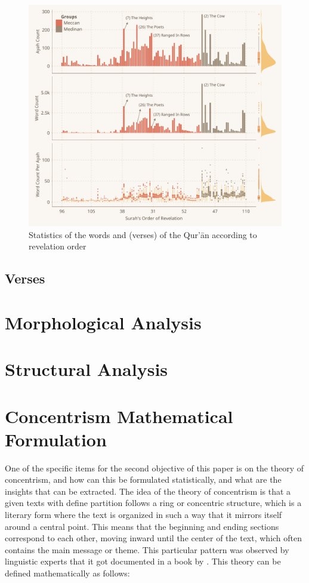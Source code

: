 \begin{figure}[!t]
    \centering
    \includegraphics[width=\textwidth]{img/plot2.pdf}
    \caption{Statistics of the words and   (verses) of the Qur'\=an according to revelation order}
    \label{fig:ch4_ayah_word_count_rev_order}
\end{figure}

\subsection{Verses}\label{sec:ch4_desc_stat_verse}
\section{Morphological Analysis}\label{sec:ch4_morphological_analysis}
\section{Structural Analysis}\label{sec:ch4_structural_analysis}
\section{Concentrism Mathematical Formulation}
One of the specific items for the second objective of this paper is on the theory of concentrism, and how can this be formulated statistically, and what are the insights that can be extracted. The idea of the theory of concentrism is that a given texts with define partition follows a ring or concentric structure, which is a literary form where the text is organized in such a way that it mirrors itself around a central point. This means that the beginning and ending sections correspond to each other, moving inward until the center of the text, which often contains the main message or theme. This particular pattern was observed by linguistic experts that it got documented in a book by . This theory can be defined mathematically as follows:

